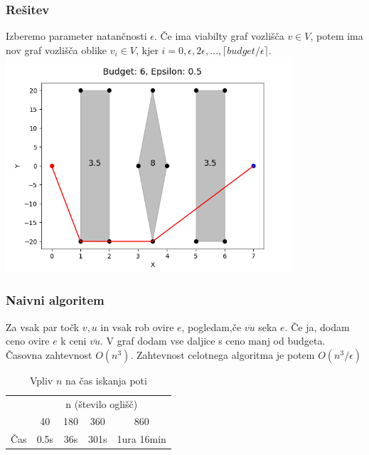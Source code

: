 \documentclass{beamer}
\begin{document}
\begin{frame}
    \frametitle{Rešitev}
    Izberemo parameter natančnosti $\epsilon$.
    Če ima viabilty graf vozlišča $v \in V$, potem ima nov graf vozlišča oblike $v_i \in V$, kjer $i = 0, \epsilon, 2\epsilon, \dots, \lceil budget/\epsilon\rceil$.
    \pause
    \includegraphics[width=0.8\textwidth]{errPath1.png}

\end{frame}

\begin{frame}
    \frametitle{Naivni algoritem}
    Za vsak par točk $v,u$ in vsak rob ovire $e$, pogledam,če $\overline{vu}$ seka $e$. Če ja, dodam ceno ovire $e$ k ceni $\overline{vu}$. V graf dodam vse daljice s ceno manj od budgeta.
    \pause
    Časovna zahtevnost $O(n^3)$. Zahtevnost celotnega algoritma je potem  $O(n^3/\epsilon)$
    \pause
    \begin{table}[h]
        \centering
        \begin{tabular}{|c|c|c|c|c|}
            \hline
            & \multicolumn{4}{c|}{n (število oglišč)} \\
            \cline{2-5}
            & 40 & 180 & 360 & 860 \\
            \hline
            Čas & 0.5s & 36s &  301s &  1ura 16min\\
            \hline
        \end{tabular}
        \caption{Vpliv $n$ na čas iskanja poti}
        \label{tab:1}
    \end{table}

\end{frame}
\end{document}
